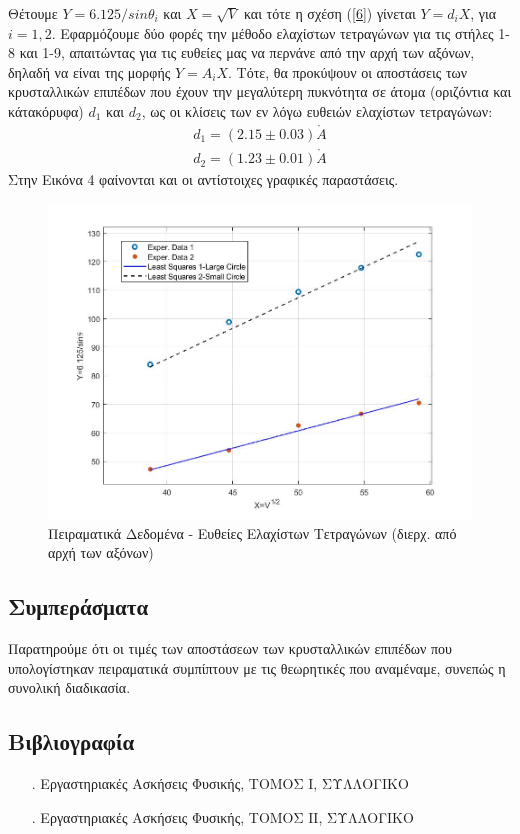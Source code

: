 \documentclass[a4paper]{article}
\begin{document}
Θέτουμε $Y=6.125/sin\theta_i$ και $X=\sqrt{V}$ και τότε η σχέση (\ref{6}) γίνεται $Y=d_iX$, για $i=1,2$.
Εφαρμόζουμε δύο φορές την μέθοδο ελαχίστων τετραγώνων για τις στήλες 1-8 και 1-9, απαιτώντας για τις ευθείες μας να περνάνε από την αρχή των αξόνων, δηλαδή να είναι της μορφής $Y=A_i X$.\footnotemark
{}
 Τότε, θα προκύψουν οι αποστάσεις των κρυσταλλικών επιπέδων που έχουν την μεγαλύτερη πυκνότητα σε άτομα (οριζόντια και κάτακόρυφα)  $d_1$ και $d_2$, ως οι κλίσεις των εν λόγω ευθειών ελαχίστων τετραγώνων:
\begin{align*}
d_1 = (2.15\pm0.03)\mathring{A} \\
d_2 = (1.23\pm0.01)\mathring{A}
\end{align*}
Στην Εικόνα 4 φαίνονται και οι αντίστοιχες γραφικές παραστάσεις.

\begin{figure}[h!]
\centering
\caption{Πειραματικά Δεδομένα - Ευθείες Ελαχίστων Τετραγώνων  (διερχ. από αρχή των αξόνων)}
\includegraphics[scale=0.5]{leastsq.jpg}
\end{figure}

\subsection*{Συμπεράσματα}
Παρατηρούμε ότι οι τιμές των αποστάσεων των κρυσταλλικών επιπέδων που υπολογίστηκαν πειραματικά συμπίπτουν με τις θεωρητικές που αναμέναμε, συνεπώς η συνολική διαδικασία.
\subsection*{Βιβλιογραφία}
\begin{itemize}
\item[.]  Εργαστηριακές Ασκήσεις Φυσικής, ΤΟΜΟΣ Ι, ΣΥΛΛΟΓΙΚΟ
\item[.]  Εργαστηριακές Ασκήσεις Φυσικής, ΤΟΜΟΣ ΙI, ΣΥΛΛΟΓΙΚΟ
\end{itemize}
\end{document}
